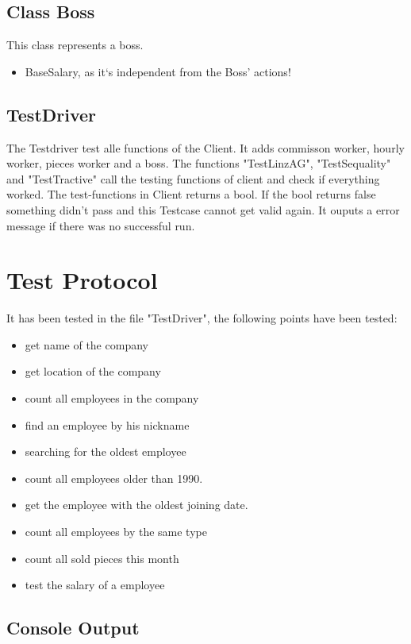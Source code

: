 \subsection{Class Boss}
This class represents a boss.
\begin{itemize}
	\item BaseSalary, as it`s independent from the Boss' actions!
\end{itemize}

\subsection{TestDriver}
The Testdriver test alle functions of the Client. It adds commisson worker, hourly worker, pieces worker and a boss.
The functions "TestLinzAG", "TestSequality" and "TestTractive" call the testing functions of client and check if everything worked.
The test-functions in Client returns a bool. If the bool returns false something didn't pass and this Testcase cannot get valid again.
It ouputs a error message if there was no successful run.

\newpage
\section{Test Protocol}
It has been tested in the file "TestDriver", the following points have been tested:
\begin{itemize}
	\item get name of the company
	\item get location of the company
	\item count all employees in the company
	\item find an employee by his nickname
	\item searching for the oldest employee
	\item count all employees older than 1990.
	\item get the employee with the oldest joining date.
	\item count all employees by the same type
	\item count all sold pieces this month
	\item test the salary of a employee
\end{itemize}

\subsection{Console Output}
\newpage


